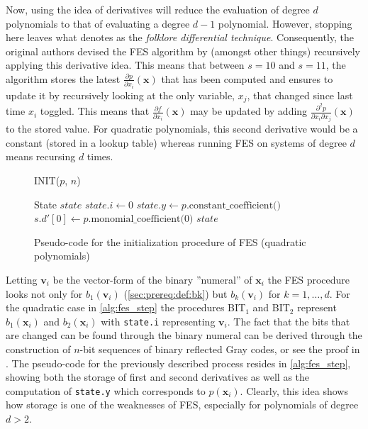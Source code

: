 Now, using the idea of derivatives will reduce the evaluation of degree $d$ polynomials to that of evaluating a degree $d-1$ polynomial. However, stopping here leaves what \cite{ches-2010-23990} denotes as the \textit{folklore differential technique}. Consequently, the original authors devised the FES algorithm by (amongst other things) recursively applying this derivative idea. This means that between $s = 10$ and $s = 11$, the algorithm stores the latest $\frac{\partial p}{\partial x_i}(\mathbf{x})$ that has been computed and ensures to update it by recursively looking at the only variable, $x_j$, that changed since last time $x_i$ toggled. This means that $\frac{\partial f}{\partial x_i}(\mathbf{x})$ may be updated by adding $\frac{\partial^2 p}{\partial x_i \partial x_j}(\mathbf{x})$ to the stored value. For quadratic polynomials, this second derivative would be a constant (stored in a lookup table) whereas running FES on systems of degree $d$ means recursing $d$ times. 

\begin{figure}[t]
    \begin{alg}
        \caption{INIT($p$, $n$)}\label{alg:fes_init}
        State $state$\;
        $state.i \gets 0$\;
        $state.y \gets p.\text{constant\_coefficient()}$\;
        $s.d'[0] \gets p.\text{monomial\_coefficient(0)}$\;
        \Return $state$\;
    \end{alg}
    \caption{Pseudo-code for the initialization procedure of FES (quadratic polynomials)}
\end{figure}

Letting $\mathbf{v}_i$ be the vector-form of the binary ''numeral'' of $\mathbf{x}_i$ the FES procedure looks not only for $b_1(\mathbf{v}_i)$ (\cref{sec:prereq:def:bk}) but $b_k(\mathbf{v}_i)$ for $k=1,\dots,d$. For the quadratic case in \cref{alg:fes_step} the procedures BIT$_1$ and BIT$_2$ represent $b_1(\mathbf{x}_i)$ and $b_2(\mathbf{x}_i)$ with \texttt{state.i} representing $\mathbf{v}_i$. The fact that the bits that are changed can be found through the binary numeral can be derived through the construction of $n$-bit sequences of binary reflected Gray codes, or see the proof in \cite{tungchoumasters}. The pseudo-code for the previously described process resides in \cref{alg:fes_step}, showing both the storage of first and second derivatives as well as the computation of \texttt{state.y} which corresponds to $p(\mathbf{x}_i)$. Clearly, this idea shows how storage is one of the weaknesses of FES, especially for polynomials of degree $d > 2$. 

